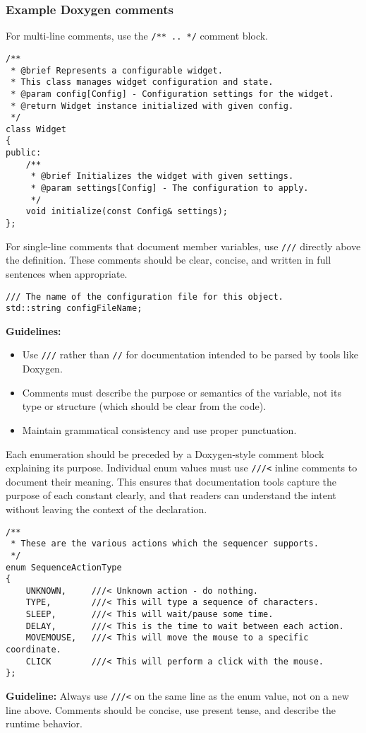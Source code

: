 \subsubsection*{Example Doxygen comments}

For multi-line comments, use the \texttt{/** .. */} comment block.
\begin{lstlisting}[style=cppstyle]
/**
 * @brief Represents a configurable widget.
 * This class manages widget configuration and state.
 * @param config[Config] - Configuration settings for the widget.
 * @return Widget instance initialized with given config.
 */
class Widget 
{
public:
    /**
     * @brief Initializes the widget with given settings.
     * @param settings[Config] - The configuration to apply.
     */
    void initialize(const Config& settings);
};
\end{lstlisting}
For single-line comments that document member variables, use \texttt{///} directly above the definition. These comments should be clear, concise, and written in full sentences when appropriate.
\begin{lstlisting}[style=cppstyle]
/// The name of the configuration file for this object.
std::string configFileName;
\end{lstlisting}
\textbf{Guidelines:}
\begin{itemize}\itemsep0em
    \item Use \texttt{///} rather than \texttt{//} for documentation intended to be parsed by tools like Doxygen.
    \item Comments must describe the purpose or semantics of the variable, not its type or structure (which should be clear from the code).
    \item Maintain grammatical consistency and use proper punctuation.
\end{itemize}
Each enumeration should be preceded by a Doxygen-style comment block explaining its purpose. Individual enum values must use \texttt{///<} inline comments to document their meaning. This ensures that documentation tools capture the purpose of each constant clearly, and that readers can understand the intent without leaving the context of the declaration.
\begin{lstlisting}[style=cppstyle]
/**
 * These are the various actions which the sequencer supports.
 */
enum SequenceActionType
{
    UNKNOWN,     ///< Unknown action - do nothing.
    TYPE,        ///< This will type a sequence of characters.
    SLEEP,       ///< This will wait/pause some time.
    DELAY,       ///< This is the time to wait between each action.
    MOVEMOUSE,   ///< This will move the mouse to a specific coordinate.
    CLICK        ///< This will perform a click with the mouse.
};
\end{lstlisting}
\textbf{Guideline:} Always use \texttt{///<} on the same line as the enum value, not on a new line above. Comments should be concise, use present tense, and describe the runtime behavior.


